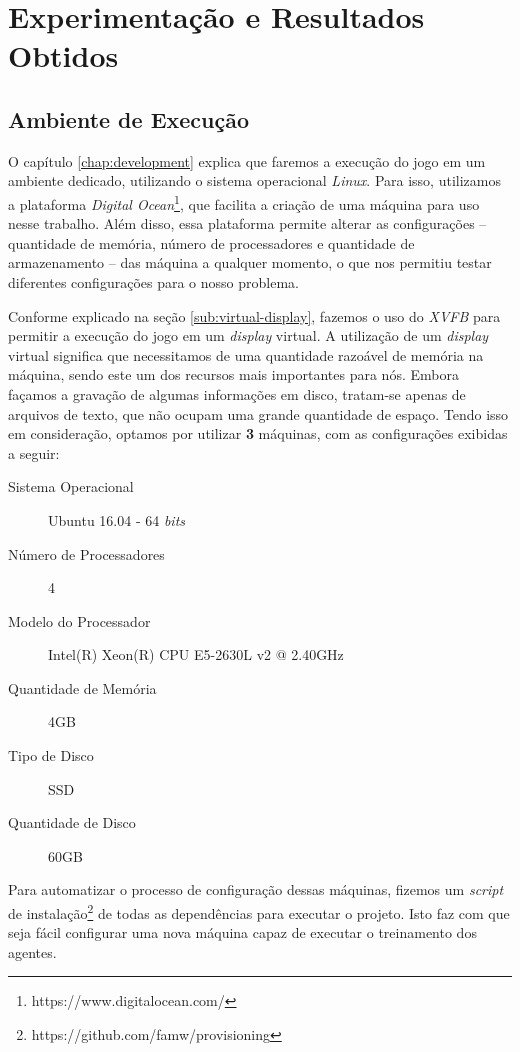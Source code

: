 \chapter{\label{chap:experimentation-and-results}Experimentação e Resultados Obtidos}


\section{\label{section:environment}Ambiente de Execução}
O capítulo \ref{chap:development} explica que faremos a execução do jogo em um
ambiente dedicado, utilizando o sistema operacional \textit{Linux}. Para isso,
utilizamos a plataforma \textit{Digital
Ocean}\footnote{https://www.digitalocean.com/}, que facilita a criação de uma
máquina para uso nesse trabalho. Além disso, essa plataforma permite alterar as
configurações -- quantidade de memória, número de processadores e quantidade de
armazenamento -- das máquina a qualquer momento, o que nos permitiu testar
diferentes configurações para o nosso problema.

Conforme explicado na seção \ref{sub:virtual-display}, fazemos o uso do
\textit{XVFB} para permitir a execução do jogo em um \textit{display} virtual. A
utilização de um \textit{display} virtual significa que necessitamos de uma
quantidade razoável de memória na máquina, sendo este um dos recursos mais
importantes para nós. Embora façamos a gravação de algumas informações em disco,
tratam-se apenas de arquivos de texto, que não ocupam uma grande quantidade de
espaço. Tendo isso em consideração, optamos por utilizar \textbf{3} máquinas,
com as configurações exibidas a seguir:

\begin{description}
    \item [Sistema Operacional] Ubuntu 16.04 - 64 \textit{bits}
    \item [Número de Processadores] 4
    \item [Modelo do Processador] Intel(R) Xeon(R) CPU E5-2630L v2 @ 2.40GHz
    \item [Quantidade de Memória] 4GB
    \item [Tipo de Disco] SSD
    \item [Quantidade de Disco] 60GB
\end{description}

Para automatizar o processo de configuração dessas máquinas, fizemos um
\textit{script} de instalação\footnote{https://github.com/famw/provisioning} de
todas as dependências para executar o projeto. Isto faz com que seja fácil
configurar uma nova máquina capaz de executar o treinamento dos agentes.


